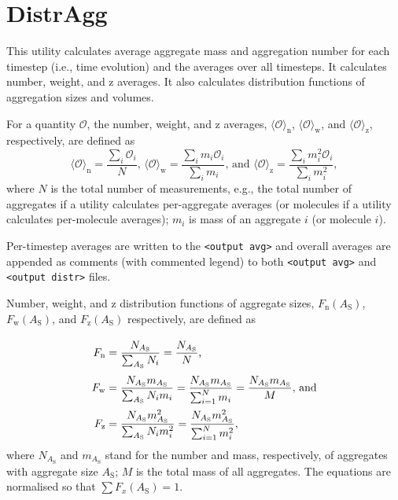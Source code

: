 \section{DistrAgg} \label{sec:DistrAgg}

This utility calculates average aggregate mass and aggregation number for
each timestep (i.e., time evolution) and the averages over all timesteps.
It calculates number, weight, and z averages. It also calculates
distribution functions of aggregation sizes and volumes.

For a quantity $\mathcal{O}$, the number, weight, and z averages,
$\langle\mathcal{O}\rangle_{\mathrm{n}}$,
$\langle\mathcal{O}\rangle_{\mathrm{w}}$, and
$\langle\mathcal{O}\rangle_{\mathrm{z}}$, respectively, are defined as
\begin{equation} \label{eq:Avg}
  \langle\mathcal{O}\rangle_{\mathrm{n}} = \frac{\sum_i\mathcal{O}_i}{N}
  \mbox{, \ \ \ }
  \langle\mathcal{O}\rangle_{\mathrm{w}} = \frac{\sum_i m_i\mathcal{O}_i}{\sum_i m_i}
  \mbox{, and \ \ \ }
  \langle\mathcal{O}\rangle_{\mathrm{z}} = \frac{\sum_i m_i^2\mathcal{O}_i}{\sum_i m_i^2},
\end{equation}
where $N$ is the total number of measurements, e.g., the total number of
aggregates if a utility calculates per-aggregate averages (or molecules if
a utility calculates per-molecule averages); $m_i$ is mass of an aggregate
$i$ (or molecule $i$).

Per-timestep averages are written to the \texttt{<output avg>} and overall
averages are appended as comments (with commented legend) to both
\texttt{<output avg>} and \texttt{<output distr>} files.

Number, weight, and z distribution functions of aggregate sizes,
$F_{\mathrm{n}}(A_{\mathrm{S}})$, $F_{\mathrm{w}}(A_{\mathrm{S}})$, and
$F_{\mathrm{z}}(A_{\mathrm{S}})$ respectively, are defined as
\begin{equation} \label{eq:Fnwz}
  \arraycolsep=1.4pt\def\arraystretch{2.5}
  \begin{array}{>{\displaystyle}rc>{\displaystyle}l}
    F_{\mathrm{n}} & = & \frac{N_{A_{\mathrm{S}} }}{\sum_{A_{\mathrm{S}} } N_i} =
    \frac{N_{A_{\mathrm{S}} }}{N}
  \mbox{,} \\
    F_{\mathrm{w}} & = & \frac{N_{A_{\mathrm{S}} } m_{A_{\mathrm{S}} }}{\sum_{A_{\mathrm{S}} } N_i m_i} =
    \frac{N_{A_{\mathrm{S}} } m_{A_{\mathrm{S}} }}{\sum_{i=1}^N m_i} =
    \frac{N_{A_{\mathrm{S}} } m_{A_{\mathrm{S}} }}{M}
  \mbox{, and} \\
    F_{\mathrm{z}} & = & \frac{N_{A_{\mathrm{S}} } m^2_{A_{\mathrm{S}}
    }}{\sum_{A_{\mathrm{S}} } N_i m_i^2} =
    \frac{N_{A_{\mathrm{S}} } m^2_{A_{\mathrm{S}} }}{\sum_{i=1}^N m_i^2}, \\
  \end{array}
\end{equation}
where $N_{A_{\mathrm{S}}}$ and $m_{A_{\mathrm{S}}}$ stand for the number
and mass, respectively, of aggregates with aggregate size $A_{\mathrm{S}}$;
$M$ is the total mass of all aggregates. The equations are normalised so
that $\sum F_x(A_{\mathrm{S}})=1$.

